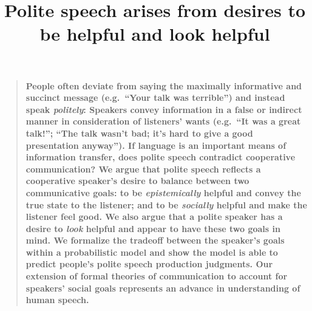 \documentclass[12pt]{article}
\title{Polite speech arises from desires to be helpful and look helpful}
\author
%
{Erica J. Yoon,$^{1\ast\dagger}$ Michael Henry Tessler,$^{1\ast}$ Noah D. Goodman,$^{1}$ Michael C. Frank$^{1}$\\
\\
\normalsize{$^{1}$Department of Psychology, Stanford University,}\\
\normalsize{450 Serra Mall, Stanford, CA 94305.}
\\
\normalsize{$^\ast$These authors contributed equally to this work.}
\\
\normalsize{$^\dagger$To whom correspondence should be addressed; E-mail: ejyoon@stanford.edu.}
}
\date{}
\newenvironment{sciabstract}{%
\begin{quote} \bf}
{\end{quote}}
\begin{document}
 


\baselineskip24pt


\maketitle 






\begin{sciabstract}
People often deviate from saying the maximally informative and succinct message 
(e.g.~\enquote{Your talk was terrible}) 
and instead speak \emph{politely}: 
Speakers convey information in a false or indirect manner in consideration of listeners' wants
(e.g.~\enquote{It was a great talk!}; \enquote{The talk wasn't bad; it's hard to give a good presentation anyway}). 
If language is an important means of information transfer, does polite speech contradict cooperative communication?
We argue that polite speech reflects a cooperative speaker's desire to balance between two communicative goals: 
to be \emph{epistemically} helpful and convey the true state to the listener;
and to be \emph{socially} helpful and make the listener feel good.
We also argue that a polite speaker has a desire to \emph{look} helpful and 
appear to have these two goals in mind. 
We formalize the tradeoff between the speaker's goals within a probabilistic model 
and show the model is able to predict people's polite speech production judgments. 
Our extension of formal theories of communication to account for speakers' social
goals represents an advance in understanding of human speech.
\end{sciabstract}
\end{document}
